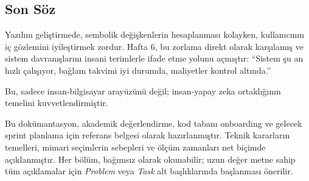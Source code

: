 \documentclass[12pt,a4paper]{article}
\begin{document}
\subsection*{Son Söz}

Yazılım geliştirmede, sembolik değişkenlerin hesaplanması kolayken, kullanıcının iç gözlemini iyileştirmek zordur. Hafta 6, bu zorlama direkt olarak karşılamış ve sistem davranışlarını insani terimlerle ifade etme yolunu açmıştır: ``Sistem şu an hızlı çalışıyor, bağlam takvimi iyi durumda, maliyetler kontrol altında.''

Bu, sadece insan-bilgisayar arayüzünü değil; insan-yapay zeka ortaklığının temelini kuvvetlendirmiştir.

\begin{infobox}
Bu dokümantasyon, akademik değerlendirme, kod tabanı onboarding ve gelecek sprint planlama için referans belgesi olarak hazırlanmıştır. Teknik kararların temelleri, mimari seçimlerin sebepleri ve ölçüm zamanları net biçimde açıklanmıştır. Her bölüm, bağımsız olarak okunabilir; uzun değer metne sahip tüm açıklamalar için \textit{Problem} veya \textit{Task} alt başlıklarında başlanması önerilir.
\end{infobox}
\end{document}
